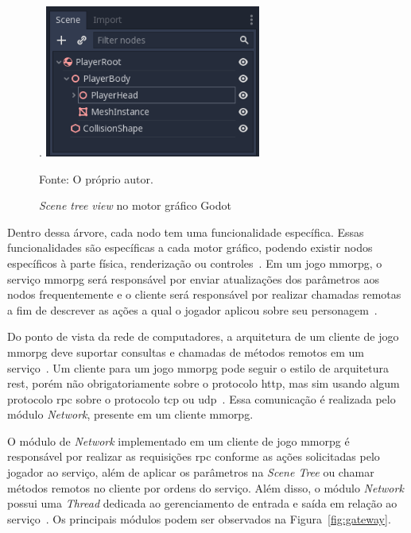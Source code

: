\begin{figure}[htb!]
\caption{\textit{Scene tree view} no motor gráfico Godot}.
\label{fig:scene_tree}
\includegraphics[height=5cm]{img/cap2/scene_tree.png}
\centering

Fonte: O próprio autor.
\end{figure}



Dentro dessa árvore, cada nodo tem uma funcionalidade específica.
%
Essas funcionalidades são específicas a cada motor gráfico, podendo existir nodos específicos à parte física, renderização ou controles~\cite{godot_docs}.
%
Em um jogo \ac{mmorpg}, o serviço \ac{mmorpg} será responsável por enviar atualizações dos parâmetros aos nodos frequentemente e o cliente será responsável por realizar chamadas remotas a fim de descrever as ações a qual o jogador aplicou sobre seu personagem~\cite{photon_engine}.


Do ponto de vista da rede de computadores, a arquitetura de um cliente de jogo \ac{mmorpg} deve suportar consultas e chamadas de métodos remotos em um serviço~\cite{albion_online_unite}.
%
Um cliente para um jogo \ac{mmorpg} pode seguir o estilo de arquitetura \ac{rest}, porém não obrigatoriamente sobre o protocolo \ac{http}, mas sim usando algum protocolo \ac{rpc} sobre o protocolo \ac{tcp} ou \ac{udp}~\cite{albion_online_unite, stephenclarkewillson2017}.
%
Essa comunicação é realizada pelo módulo \textit{Network}, presente em um cliente \ac{mmorpg}.


O módulo de \textit{Network} implementado em um cliente de jogo \ac{mmorpg} é responsável por realizar as requisições \ac{rpc} conforme as ações solicitadas pelo jogador ao serviço, além de aplicar os parâmetros na \textit{Scene Tree} ou chamar métodos remotos no cliente por ordens do serviço.
%
Além disso, o módulo \textit{Network} possui uma \textit{Thread} dedicada ao gerenciamento de entrada e saída em relação ao serviço~\cite{albion_online_unite}.
%
Os principais módulos podem ser observados na Figura~\ref{fig:gateway}.


